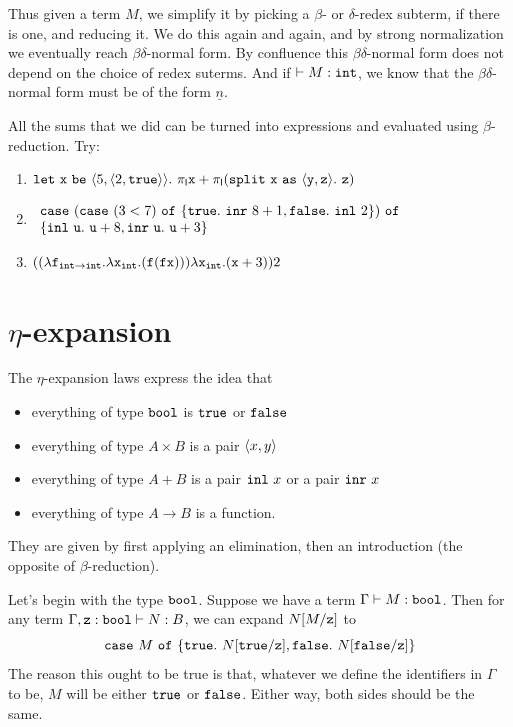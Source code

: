 \documentclass[runningheads,12pt]{llncs}
\newcommand{\ttletmac}[2]{\mathtt{let}\ {#2}\ \mathtt{be}\ {#1}.\ }
\newcommand{\ttspof}{\ \mathtt{as}\ }
\newcommand{\projl}{\pi_{\mathsf{l}}}
\begin{document}
Thus given a term $M$, we simplify it by picking a $\beta$- or $\delta$-redex subterm, if there is one, and reducing it.  We do this again and again, and by strong normalization we eventually reach $\beta\delta$-normal form.  By confluence this $\beta\delta$-normal form does not depend on the choice of redex suterms.  And if $\vdash M : \mathtt{int}$, we know that the $\beta\delta$-normal form must be of the form $\underline{n}$.

\begin{exercise}
  All the sums that we did can be turned into expressions and evaluated using $\beta$-reduction.  Try:
  \begin{enumerate}
  \item $\ttletmac{ \pair{5}{\pair{2}{\tttrue}} }{ \ttx } \projl \ttx + \projl (\ttsplit \ttx \ttspof \pair{\tty}{\ttz} \ttin \ttz)$
  \item $
    \begin{array}{l}
\ttcase (\ttcase (3<7) \ttof \{\tttrue.\ \tttagr{8+1}, \ttfalse.\ \tttagl{2} \}) \ttof \\
\{ \tttagl{\ttu}.\ \ttu+8, \tttagr{\ttu}.\ \ttu+3 \} \\
\end{array}
$
  \item $((\lambda \mathtt{f}_{\mathtt{int} \rightarrow \mathtt{int}}. \lambda \mathtt{x}_{\mathtt{int}}. (\mathtt{f}(\mathtt{f}\mathtt{x})))\lambda \mathtt{x}_{\mathtt{int}}. (\mathtt{x}+3))2$
  \end{enumerate}
\end{exercise}

\section{$\eta$-expansion}

The $\eta$-expansion laws express the idea that
\begin{itemize}
\item everything of type $\mathtt{bool}$ is $\mathtt{true}$ or $\mathtt{false}$
\item everything of type $A \times B$ is a pair $\langle {{x},{y}} \rangle$
\item everything of type $A + B$ is a pair $\mathtt{inl} \  {x}$ or a pair $\mathtt{inr} \  {x}$
\item everything of type $A \rightarrow B$ is a function.
\end{itemize}
They are given by first applying an elimination, then an introduction (the opposite of $\beta$-reduction).

Let's begin with the type $\mathtt{bool}$.  Suppose we have a term $\Gamma \vdash M: \mathtt{bool}$.  Then for any term $\Gamma, \mathtt{z}:\mathtt{bool} \vdash N:B$, we can expand $N[M/\mathtt{z}]$ to 
\begin{displaymath}
  \ttcase M \ttof \{ \tttrue.\ N[\tttrue/\ttz],\ttfalse.\ N[\ttfalse/\ttz] \}\end{displaymath}
The reason this ought to be true is that, whatever we define the identifiers in $\Gamma$ to be, $M$ will be either $\mathtt{true}$ or $\mathtt{false}$.  Either way, both sides should be the same.
\end{document}
